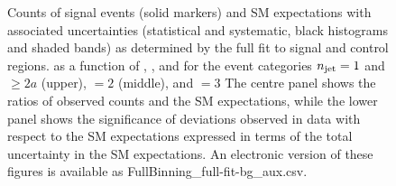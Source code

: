 \begin{figure}
\begin{center}
  \caption{Counts of signal events (solid markers) and SM expectations
    with associated uncertainties (statistical and systematic, black
    histograms and shaded bands) 
    as determined by the full fit to signal and control regions.
    as a function of \nb, \scalht, and \mht for the event categories
    $n_{\text{jet}} = 1$ and ${\geq}2a$ (upper), $=2$ (middle), and $=3$
    The centre panel shows the ratios of
    observed counts and the SM expectations, while the lower panel
    shows the significance of deviations observed in data with respect
    to the SM expectations expressed in terms of the total uncertainty
    in the SM expectations.
    An electronic version of these figures is available as FullBinning\_full-fit-bg\_aux.csv.
    }
        \label{fig:T1qqqqLL_full-fit_123}
    \end{center}
\end{figure}

